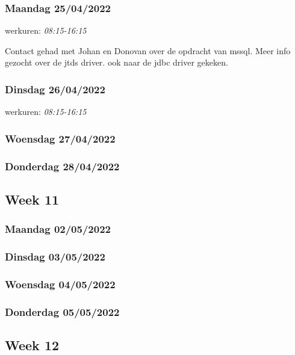 \subsubsection{Maandag 25/04/2022}

werkuren: \emph{08:15-16:15}

Contact gehad met Johan en Donovan over de opdracht van \gls{mssql}. Meer info gezocht over de jtds driver. ook naar de jdbc driver gekeken.

\subsubsection{Dinsdag 26/04/2022}

werkuren: \emph{08:15-16:15}

\subsubsection{Woensdag 27/04/2022}

\subsubsection{Donderdag 28/04/2022}

\subsection{Week 11}

\subsubsection{Maandag 02/05/2022}

\subsubsection{Dinsdag 03/05/2022}

\subsubsection{Woensdag 04/05/2022}

\subsubsection{Donderdag 05/05/2022}

\subsection{Week 12}

